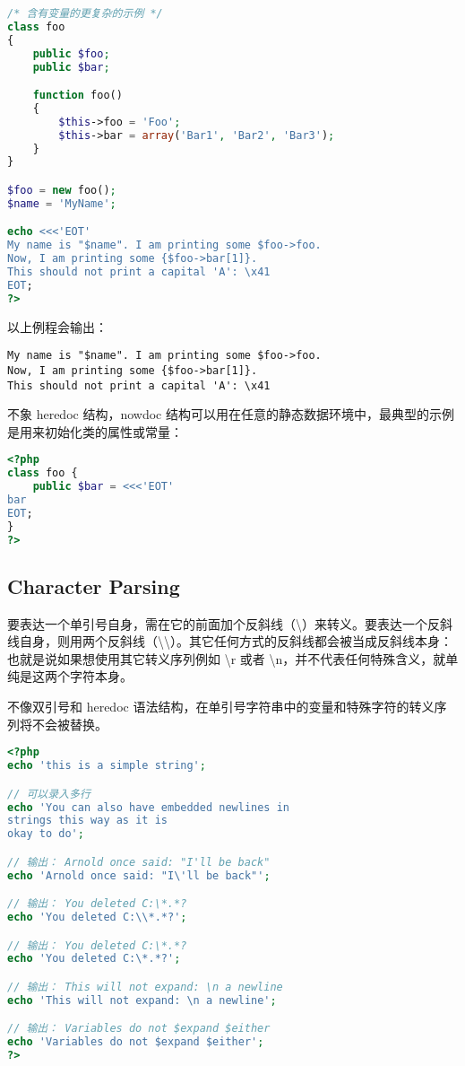 \begin{compactitem}
\begin{lstlisting}[language=PHP]
/* 含有变量的更复杂的示例 */
class foo
{
    public $foo;
    public $bar;

    function foo()
    {
        $this->foo = 'Foo';
        $this->bar = array('Bar1', 'Bar2', 'Bar3');
    }
}

$foo = new foo();
$name = 'MyName';

echo <<<'EOT'
My name is "$name". I am printing some $foo->foo.
Now, I am printing some {$foo->bar[1]}.
This should not print a capital 'A': \x41
EOT;
?>
\end{lstlisting}

以上例程会输出：

\begin{verbatim}
My name is "$name". I am printing some $foo->foo.
Now, I am printing some {$foo->bar[1]}.
This should not print a capital 'A': \x41
\end{verbatim}

不象 heredoc 结构，nowdoc 结构可以用在任意的静态数据环境中，最典型的示例是用来初始化类的属性或常量：

\begin{lstlisting}[language=PHP]
<?php
class foo {
    public $bar = <<<'EOT'
bar
EOT;
}
?>
\end{lstlisting}

\end{compactitem}


\subsection{Character Parsing}



要表达一个单引号自身，需在它的前面加个反斜线（\textbackslash）来转义。要表达一个反斜线自身，则用两个反斜线（\textbackslash \textbackslash）。其它任何方式的反斜线都会被当成反斜线本身：也就是说如果想使用其它转义序列例如 \textbackslash r 或者 \textbackslash n，并不代表任何特殊含义，就单纯是这两个字符本身。



不像双引号和 heredoc 语法结构，在单引号字符串中的变量和特殊字符的转义序列将不会被替换。

\begin{lstlisting}[language=PHP]
<?php
echo 'this is a simple string';

// 可以录入多行
echo 'You can also have embedded newlines in 
strings this way as it is
okay to do';

// 输出： Arnold once said: "I'll be back"
echo 'Arnold once said: "I\'ll be back"';

// 输出： You deleted C:\*.*?
echo 'You deleted C:\\*.*?';

// 输出： You deleted C:\*.*?
echo 'You deleted C:\*.*?';

// 输出： This will not expand: \n a newline
echo 'This will not expand: \n a newline';

// 输出： Variables do not $expand $either
echo 'Variables do not $expand $either';
?>
\end{lstlisting}


